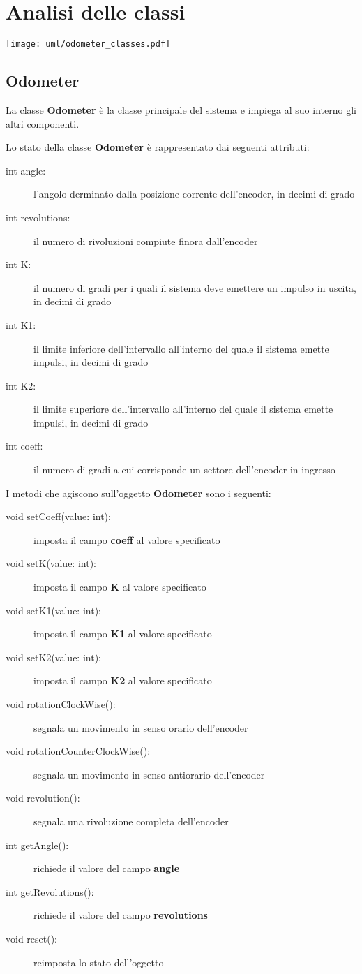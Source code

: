 \documentclass [11pt,a4paper,oneside]{article}
\begin{document}
\section{Analisi delle classi}
\begin{center}
    \texttt{[image: uml/odometer\_classes.pdf]}
    \label{usecases}
\end{center}

\subsection{Odometer}
La classe \textbf{Odometer} è la classe principale del sistema e
impiega al suo interno gli altri componenti.

Lo stato della classe \textbf{Odometer} è rappresentato
dai seguenti attributi:

\begin{description}
\item[int angle:] l'angolo derminato dalla posizione corrente dell'encoder,
     in decimi di grado
\item[int revolutions:] il numero di rivoluzioni compiute finora dall'encoder
\item[int K:] il numero di gradi per i quali il sistema deve emettere un
     impulso in uscita, in decimi di grado
\item[int K1:] il limite inferiore dell'intervallo all'interno del quale
     il sistema emette impulsi, in decimi di grado
\item[int K2:] il limite superiore dell'intervallo all'interno del quale
     il sistema emette impulsi, in decimi di grado
\item[int coeff:] il numero di gradi a cui corrisponde un settore
     dell'encoder in ingresso
\end{description}

I metodi che agiscono sull'oggetto \textbf{Odometer} sono i seguenti:

\begin{description}
\item[void setCoeff(value: int):] imposta il campo \textbf{coeff} al
     valore specificato
\item[void setK(value: int):] imposta il campo \textbf{K} al
     valore specificato
\item[void setK1(value: int):] imposta il campo \textbf{K1} al
     valore specificato
\item[void setK2(value: int):] imposta il campo \textbf{K2} al
     valore specificato
\item[void rotationClockWise():] segnala un movimento in senso orario
     dell'encoder
\item[void rotationCounterClockWise():] segnala un movimento in senso 
     antiorario dell'encoder
\item[void revolution():] segnala una rivoluzione completa dell'encoder
\item[int getAngle():] richiede il valore del campo \textbf{angle}
\item[int getRevolutions():] richiede il valore del campo
    \textbf{revolutions}
\item[void reset():] reimposta lo stato dell'oggetto
\end{description}
\end{document}
